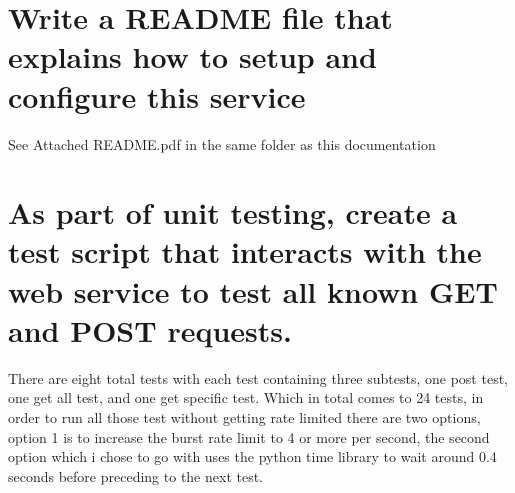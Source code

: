 \documentclass{article}
\begin{document}
    \section{Write a README file that explains how to setup and configure this service}
    See Attached README.pdf in the same folder as this documentation
    
    \section{As part of unit testing, create a test script that interacts with the web service to test all known GET and POST requests.}
    
     There are eight total tests with each test containing three subtests, one post test, one get all test, and one get specific test. Which in total comes to 24 tests, in order to run all those test without getting rate limited there are two options, option 1 is to increase the burst rate limit to 4 or more per second, the second option which i chose to go with uses the python time library to wait around 0.4 seconds before preceding to the next test.
\end{document}
